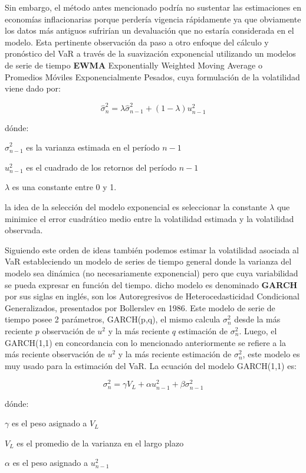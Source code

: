 \documentclass[10pt,]{article}
\begin{document}
Sin embargo, el método antes mencionado podría no sustentar las
estimaciones en economías inflacionarias porque perdería vigencia
rápidamente ya que obviamente los datos más antiguos sufrirían un
devaluación que no estaría considerada en el modelo. Esta pertinente
observación da paso a otro enfoque del cálculo y pronóstico del VaR a
través de la suavización exponencial utilizando un modelos de serie de
tiempo \textbf{EWMA} Exponentially Weighted Moving Average o Promedios
Móviles Exponencialmente Pesados, cuya formulación de la volatilidad
viene dado por:

\[\hat{\sigma}_n^2 = \lambda \hat{\sigma}_{n-1}^2 + (1 - \lambda) u_{n-1}^2\]

dónde:

\(\hat{\sigma}_{n-1}^2\) es la varianza estimada en el período \(n-1\)

\(u_{n-1}^2\) es el cuadrado de los retornos del período \(n-1\)

\(\lambda\) es una constante entre 0 y 1.

la idea de la selección del modelo exponencial es seleccionar la
constante \(\lambda\) que minimice el error cuadrático medio entre la
volatilidad estimada y la volatilidad observada.

Siguiendo este orden de ideas también podemos estimar la volatilidad
asociada al VaR estableciendo un modelo de series de tiempo general
donde la varianza del modelo sea dinámica (no necesariamente
exponencial) pero que cuya variabilidad se pueda expresar en función del
tiempo. dicho modelo es denominado \textbf{GARCH} por sus siglas en
inglés, son los Autoregresivos de Heterocedasticidad Condicional
Generalizados, presentados por Bollerslev en 1986. Este modelo de serie
de tiempo posee 2 parámetros, GARCH(p,q), el mismo calcula
\(\sigma_n^2\) desde la más reciente \(p\) observación de \(u^2\) y la
más reciente \(q\) estimación de \(\sigma_n^2\). Luego, el GARCH(1,1) en
concordancia con lo mencionado anteriormente se refiere a la más
reciente observación de \(u^2\) y la más reciente estimación de
\(\sigma_n^2\), este modelo es muy usado para la estimación del VaR. La
ecuación del modelo GARCH(1,1) es:

\[\sigma_n^2 = \gamma V_L + \alpha u_{n-1}^2 + \beta \sigma_{n-1}^2\]

dónde:

\(\gamma\) es el peso asignado a \(V_L\)

\(V_L\) es el promedio de la varianza en el largo plazo

\(\alpha\) es el peso asignado a \(u_{n-1}^2\)
\end{document}
